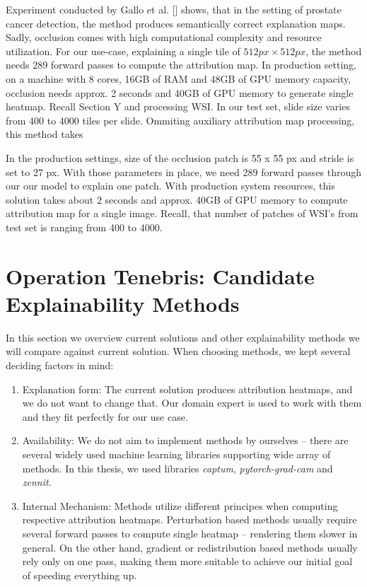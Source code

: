 Experiment conducted by Gallo et al. [] shows, that in the setting of prostate cancer detection, the method produces semantically correct explanation maps. Sadly, occlusion comes with high computational complexity and resource utilization. For our use-case, explaining a single tile of $512px \times 512px$, the method needs 289 forward passes to compute the attribution map. In production setting, on a machine with 8 cores, 16GB of RAM and 48GB of GPU memory capacity, occlusion needs approx. 2 seconds and 40GB of GPU memory to generate single heatmap. Recall Section Y and processing WSI. In our test set, slide size varies from 400 to 4000 tiles per slide. Ommiting auxiliary attribution map processing, this method takes  


In the production settings, size of the occlusion patch is 55 x 55 px and stride is set to 27 px. With those parameters in place, we need 289 forward passes through our our model to explain one patch. With production system resources, this solution takes about 2 seconds and approx. 40GB of GPU memory to compute attribution map for a single image. Recall, that number of patches of WSI's from test set is ranging from 400 to 4000.



\section{Operation Tenebris: Candidate Explainability Methods} %


In this section we overview current solutions and other explainability methods we will compare against current solution. When choosing methods, we kept several deciding factors in mind:

\begin{enumerate}
    \item Explanation form: The current solution produces attribution heatmaps, and we do not want to change that. Our domain expert is used to work with them and they fit perfectly for our use case.
    \item Availability: We do not aim to implement methods by ourselves -- there are several widely used machine learning libraries supporting wide array of methods. In this thesis, we used libraries \emph{captum}, \emph{pytorch-grad-cam} and \emph{zennit}. 
    \item Internal Mechanism: Methods utilize different principes when computing respective attribution heatmaps. Perturbation based methods usually require several forward passes to compute single heatmap -- rendering them slower in general. On the other hand, gradient or redistribution based methods usually rely only on one pass, making them more suitable to achieve our initial goal of speeding everything up.
\end{enumerate}

